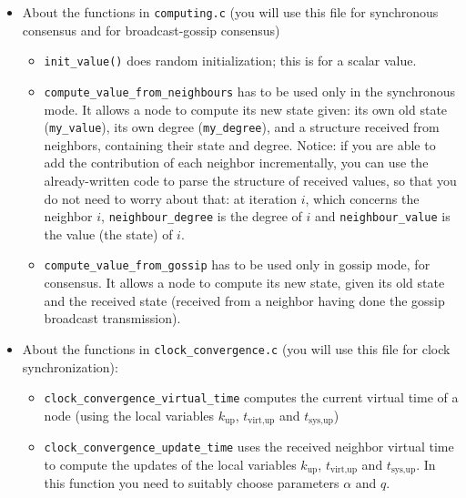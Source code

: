 \documentclass{article}
\begin{document}
\begin{itemize}
\item About the functions in \verb=computing.c= (you will use this file for synchronous consensus and for broadcast-gossip consensus)
	\begin{itemize}
	\item  \verb=init_value()= does random initialization; this is for a scalar value.
	\item \verb=compute_value_from_neighbours= has to be used only in the synchronous mode.
        It allows a node to compute its new state given: its own old state (\verb=my_value=),
        its own degree (\verb=my_degree=), and a structure received from neighbors,
        containing their state and degree. Notice: if you are able to add the
        contribution of each neighbor incrementally, you can use the
        already-written code to parse the structure of received values, so that
        you do not need to worry about that: at iteration $i$, which concerns
        the neighbor $i$, \verb=neighbour_degree= is the degree of $i$ and
        \verb=neighbour_value= is the value (the state) of $i$.
	\item \verb=compute_value_from_gossip= has to be used only in gossip mode, for consensus. It allows a node to compute its new state, given its old state and the received state (received from a neighbor having done the gossip broadcast transmission).
	\end{itemize}
\item About the functions in \verb=clock_convergence.c= (you will use this file for clock synchronization):
	\begin{itemize}
	\item \verb=clock_convergence_virtual_time= computes the current virtual time of a node (using the local variables $k_{\text{up}}$, $t_{\text{virt},\text{up}}$ and $t_{\text{sys},\text{up}}$)
	\item \verb=clock_convergence_update_time= uses the received neighbor virtual time  to compute the updates of the local variables  $k_{\text{up}}$, $t_{\text{virt},\text{up}}$ and $t_{\text{sys},\text{up}}$. In this function you need to suitably choose parameters $\alpha$ and $q$.
	\end{itemize}
\end{itemize}
\end{document}
